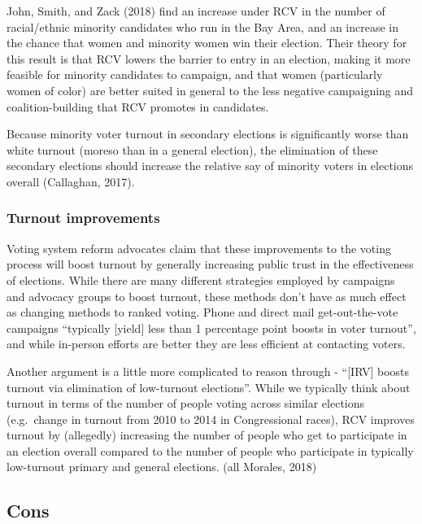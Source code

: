 \documentclass[12pt,twoside]{reedthesis}
\theoremstyle{definition}
\theoremstyle{definition}
\theoremstyle{definition}
\theoremstyle{remark}
\begin{document}
John, Smith, and Zack (2018) find an increase under RCV in the number of
racial/ethnic minority candidates who run in the Bay Area, and an
increase in the chance that women and minority women win their election.
Their theory for this result is that RCV lowers the barrier to entry in
an election, making it more feasible for minority candidates to
campaign, and that women (particularly women of color) are better suited
in general to the less negative campaigning and coalition-building that
RCV promotes in candidates.

Because minority voter turnout in secondary elections is significantly
worse than white turnout (moreso than in a general election), the
elimination of these secondary elections should increase the relative
say of minority voters in elections overall (Callaghan, 2017).

\hypertarget{turnout-improvements}{%
\subsubsection{Turnout improvements}\label{turnout-improvements}}

Voting system reform advocates claim that these improvements to the
voting process will boost turnout by generally increasing public trust
in the effectiveness of elections. While there are many different
strategies employed by campaigns and advocacy groups to boost turnout,
these methods don't have as much effect as changing methods to ranked
voting. Phone and direct mail get-out-the-vote campaigns ``typically
{[}yield{]} less than 1 percentage point boosts in voter turnout'', and
while in-person efforts are better they are less efficient at contacting
voters.

Another argument is a little more complicated to reason through -
``{[}IRV{]} boosts turnout via elimination of low-turnout elections''.
While we typically think about turnout in terms of the number of people
voting across similar elections (e.g.~change in turnout from 2010 to
2014 in Congressional races), RCV improves turnout by (allegedly)
increasing the number of people who get to participate in an election
overall compared to the number of people who participate in typically
low-turnout primary and general elections. (all Morales, 2018)

\hypertarget{cons}{%
\subsection{Cons}\label{cons}}
\end{document}
